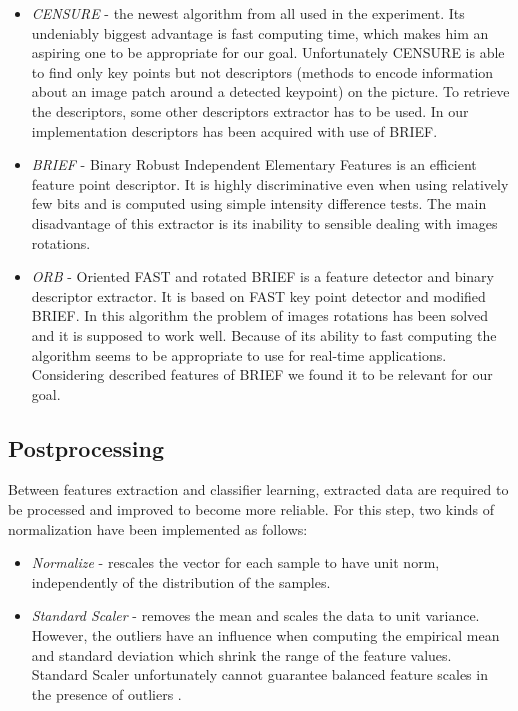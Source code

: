 \documentclass[11pt,a4paper]{article}
\begin{document}
\begin{itemize}
	\item \textit{CENSURE}\cite{CENSURE} - the newest algorithm from all used in the experiment. Its undeniably biggest advantage is fast computing time, which makes him an aspiring one to be appropriate for our goal. Unfortunately CENSURE is able to find only key points but not descriptors (methods to encode information  about  an  image  patch  around  a  detected  keypoint\cite{DESCRIPTORS}) on the picture.  To retrieve the descriptors, some other descriptors extractor has to be used. In our implementation descriptors has been acquired with use of BRIEF. 
	
	\item \textit{BRIEF} - Binary Robust Independent Elementary Features is an efficient feature point descriptor. It is highly discriminative even when using relatively few bits and is computed using simple intensity difference tests\cite{BRIEF}. The main disadvantage of this extractor is its inability to sensible dealing with images rotations.
	
	\item \textit{ORB} - Oriented FAST\cite{FAST} and rotated BRIEF is a feature detector and binary descriptor extractor. It is based on FAST key point detector and modified BRIEF\cite{ORB}. In this algorithm the problem of images rotations has been solved and it is supposed to work well. Because of its ability to fast computing the algorithm seems to be appropriate to use for real-time applications. Considering described features of BRIEF we found it to be relevant for our goal.
\end{itemize}

\subsection{Postprocessing}

Between features extraction and classifier learning, extracted data are required to be processed and improved to become more reliable. For this step, two kinds of normalization have been implemented as follows:

\begin{itemize}
	\item \textit{Normalize}  - rescales the vector for each sample to have unit norm, independently of the distribution of the samples\cite{PREPROCESSING}.
	
	\item \textit{Standard Scaler}  - removes the mean and scales the data to unit variance. However, the outliers have an influence when computing the empirical mean and standard deviation which shrink the range of the feature values. Standard Scaler unfortunately cannot guarantee balanced feature scales in the presence of outliers \cite{PREPROCESSING}.
\end{itemize}
\end{document}

